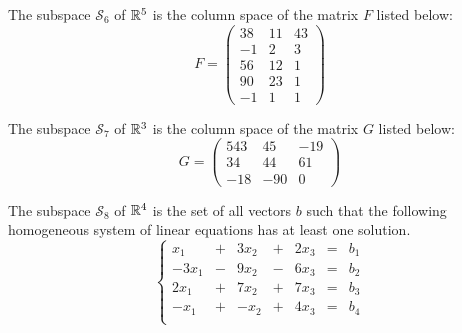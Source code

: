 \documentclass[elementsmain.tex]{subfiles}
\begin{document}
\begin{exercise}
The subspace $\mathcal{S}_6$ of $\mathbb{R}^5$ is the column space of the matrix $F$ listed below:
\[
F = \begin{pmatrix} 38 & 11 & 43 \\ -1 & 2 & 3 \\ 56 & 12 & 1 \\ 90 & 23 & 1 \\ -1 & 1 & 1 \end{pmatrix}
\]
\end{exercise}



\begin{exercise}
The subspace $\mathcal{S}_7$ of $\mathbb{R}^3$ is the column space of the matrix $G$ listed below:
\[
G = \begin{pmatrix} 543 & 45 & -19 \\ 34 & 44 & 61 \\ -18 & -90 & 0 \end{pmatrix}
\]
\end{exercise}


\begin{exercise} The subspace $\mathcal{S}_8$ of $\mathbb{R}^4$ is the set of all vectors $b$ such that the following homogeneous system of linear equations has at least one solution.
\[
\left\{\begin{array}{rrrrrrr}
x_1 & + & 3x_2 & + & 2x_3 & = & b_1 \\
-3x_1 & - & 9x_2 & - & 6x_3 & = & b_2 \\
2x_1 & + & 7x_2 & + & 7x_3 & = & b_3 \\
-x_1 & + & -x_2 & + & 4x_3 & = & b_4 \\
\end{array}\right.
\]
\end{exercise}



\clearpage
\end{document}
